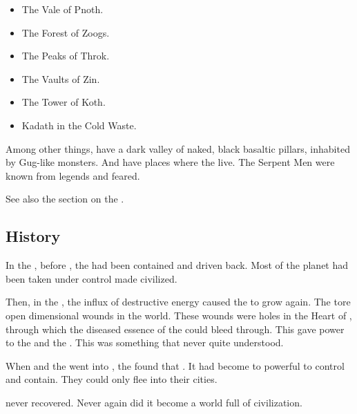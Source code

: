 \begin{itemize}
  \item The Vale of Pnoth.
  \item The Forest of Zoogs.
  \item The Peaks of Throk.
  \item The Vaults of Zin.
  \item The Tower of Koth. 
  \item Kadath in the Cold Waste.
\end{itemize}

Among other things, have a dark valley of naked, black basaltic pillars, inhabited by Gug-like monsters. 
And have places where the \quiljaaran live. 
The Serpent Men were known from legends and feared. 

See also the section on the .









\subsection{History}
In the , before \Sethicus, the \wylde had been contained and driven back.
Most of the planet had been taken under control made civilized. 

Then, in the , the influx of destructive \xs energy caused the \wylde to grow again.
The \dragons tore open dimensional wounds in the world. 
These wounds were holes in the Heart of \Miith, through which the diseased essence of the  could bleed through. 
This gave power to the  and the .
This was something that \Sethicus never quite understood.

When \Sethicus and the \dragons went into , the \ophidians found that . 
It had become to powerful to control and contain.
They could only flee into their cities. 

\Miith never recovered. 
Never again did it become a world full of civilization. 









